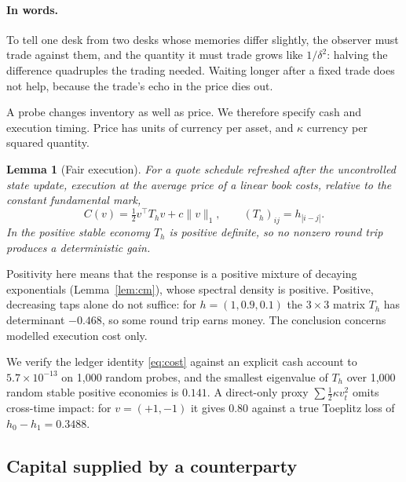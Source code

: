 \documentclass[12pt]{article}
\newtheorem{lemma}[theorem]{Lemma}
\theoremstyle{definition}
\theoremstyle{remark}
\begin{document}
\paragraph{In words.} To tell one desk from two desks whose memories differ slightly, the observer must trade against them, and the quantity it must trade grows like $1/\delta^2$: halving the difference quadruples the trading needed. Waiting longer after a fixed trade does not help, because the trade's echo in the price dies out.

A probe changes inventory as well as price. We therefore specify cash and execution timing. Price has units of currency per asset, and $\kappa$ currency per squared quantity.

\begin{lemma}[Fair execution]\label{lem:toeplitz}
For a quote schedule refreshed after the uncontrolled state update, execution at the average price of a linear book costs, relative to the constant fundamental mark,
\begin{equation}\label{eq:cost}
C(v)=\tfrac12v^\top T_hv+c\|v\|_1,\qquad (T_h)_{ij}=h_{|i-j|}.
\end{equation}
In the positive stable economy $T_h$ is positive definite, so no nonzero round trip produces a deterministic gain.
\end{lemma}

Positivity here means that the response is a positive mixture of decaying exponentials (Lemma~\ref{lem:cm}), whose spectral density is positive. Positive, decreasing taps alone do not suffice: for $h=(1,0.9,0.1)$ the $3\times3$ matrix $T_h$ has determinant $-0.468$, so some round trip earns money. The conclusion concerns modelled execution cost only.

We verify the ledger identity \eqref{eq:cost} against an explicit cash account to $5.7\times10^{-13}$ on 1,000 random probes, and the smallest eigenvalue of $T_h$ over 1,000 random stable positive economies is $0.141$. A direct-only proxy $\sum\tfrac12\kappa v_t^2$ omits cross-time impact: for $v=(+1,-1)$ it gives $0.80$ against a true Toeplitz loss of $h_0-h_1=0.3488$.

\subsection{Capital supplied by a counterparty}
\end{document}
